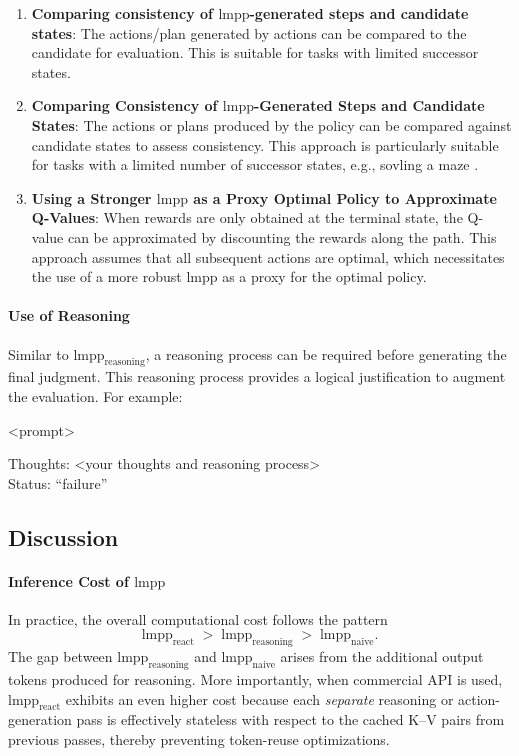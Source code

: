 \begin{enumerate}
    \item \textbf{Comparing consistency of $\text{lmpp}$-generated steps and candidate states}:
    The actions/plan generated by actions can be compared to the candidate for evaluation. This is suitable for tasks with limited successor states.

    \item \textbf{Comparing Consistency of \(\text{lmpp}\)-Generated Steps and Candidate States}:  The actions or plans produced by the policy can be compared against candidate states to assess consistency. This approach is particularly suitable for tasks with a limited number of successor states, e.g., sovling a maze \citep{meng2024llm}.

    \item \textbf{Using a Stronger \(\text{lmpp}\) as a Proxy Optimal Policy to Approximate Q-Values}:  When rewards are only obtained at the terminal state, the Q-value can be approximated by discounting the rewards along the path. This approach assumes that all subsequent actions are optimal, which necessitates the use of a more robust \(\text{lmpp}\) as a proxy for the optimal policy.
\end{enumerate}

\paragraph{Use of Reasoning}
Similar to $\text{lmpp}_\text{reasoning}$, a reasoning process can be required before generating the final judgment. This reasoning process provides a logical justification to augment the evaluation. For example:
\begin{numberedquote}
    <prompt>
    \begin{myshadowbox}
    Thoughts: <your thoughts and reasoning process> \\
    Status: ``failure''
    \end{myshadowbox}
\label{quote:lmpr_value1_koh3}
\end{numberedquote}

\subsection{Discussion}
\paragraph{Inference Cost of $\text{lmpp}$}
In practice, the overall computational cost follows the pattern
\[
    \text{lmpp}_\text{react} 
    \;>\; 
    \text{lmpp}_\text{reasoning} 
    \;>\; 
    \text{lmpp}_\text{naive}.
\]
The gap between $\text{lmpp}_\text{reasoning}$ and $\text{lmpp}_\text{naive}$ arises from the additional output tokens produced for reasoning. More importantly, when commercial API is used, $\text{lmpp}_\text{react}$ exhibits an even higher cost because each \emph{separate} reasoning or action-generation pass is effectively stateless with respect to the cached K--V pairs from previous passes, thereby preventing token-reuse optimizations.

